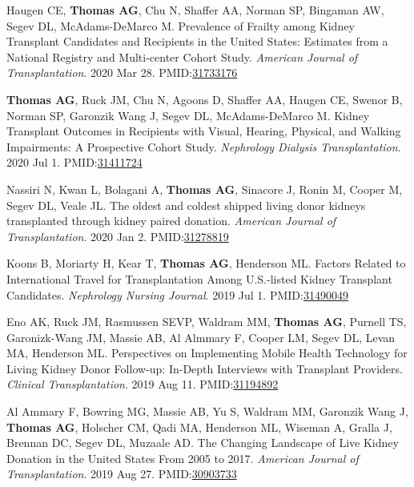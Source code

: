 \documentclass[10pt]{article}
\makeatletter
\newlength{\bibhang}
\newlength{\bibsep}
 {\@listi \global\bibsep\itemsep \global\advance\bibsep by\parsep}
\newenvironment{bibenum*}
  {\renewcommand\labelenumi{[\theenumi]}%
   \etaremune[
     topsep=0pt,
     itemsep=\bibsep,
     parsep=0pt,partopsep=0pt,
     itemindent=-\bibhang,
     leftmargin={\bibhang+\widthof{[999]}}]}
  {\endetaremune}
\newcommand{\pmid}[1]{PMID:\href{https://www.ncbi.nlm.nih.gov/pubmed/#1}{#1}}
\makeatother
\begin{document}
\begin{bibenum*}
\item Haugen CE\dag, \textbf{Thomas AG\dag}, Chu N, Shaffer AA, Norman SP,
  Bingaman AW, Segev DL, McAdams-DeMarco M.
  Prevalence of Frailty among Kidney Transplant Candidates and Recipients
  in the United States: Estimates from a National Registry and Multi-center
  Cohort Study.
  \emph{American Journal of Transplantation}. 2020 Mar 28.
  \pmid{31733176} 

\item \textbf{Thomas AG}, Ruck JM, Chu N, Agoons D, Shaffer AA, Haugen CE,
  Swenor B, Norman SP, Garonzik Wang J, Segev DL, McAdams-DeMarco M.
  Kidney Transplant Outcomes in Recipients with Visual, Hearing,
  Physical, and Walking Impairments: A Prospective Cohort Study.
  \emph{Nephrology Dialysis Transplantation}. 2020 Jul 1.
  \pmid{31411724} 

\item Nassiri N, Kwan L, Bolagani A, \textbf{Thomas AG}, Sinacore J, Ronin M,
  Cooper M, Segev DL, Veale JL.
  The oldest and coldest shipped living donor kidneys transplanted
  through kidney paired donation.
  \emph{American Journal of Transplantation}. 2020 Jan 2.
  \pmid{31278819} 

\item Koons B, Moriarty H, Kear T, \textbf{Thomas AG}, Henderson ML.
  Factors Related to International Travel for Transplantation Among U.S.-listed
  Kidney Transplant Candidates.
  \emph{Nephrology Nursing Journal}. 2019 Jul 1.
  \pmid{31490049} %

\item Eno AK, Ruck JM, Rasmussen SEVP, Waldram MM, \textbf{Thomas AG},
  Purnell TS, Garonizk-Wang JM, Massie AB, Al Almmary F, Cooper LM,
  Segev DL, Levan MA, Henderson ML.
  Perspectives on Implementing Mobile Health Technology for Living Kidney
  Donor Follow-up: In-Depth Interviews with Transplant Providers.
  \emph{Clinical Transplantation}. 2019 Aug 11.
  \pmid{31194892} 

\item Al Ammary F, Bowring MG, Massie AB, Yu S, Waldram MM, Garonzik Wang J,
  \textbf{Thomas AG}, Holscher CM, Qadi MA, Henderson ML, Wiseman A,
  Gralla J, Brennan DC, Segev DL, Muzaale AD.
  The Changing Landscape of Live Kidney Donation in the United States
  From 2005 to 2017.
  \emph{American Journal of Transplantation}. 2019 Aug 27.
  \pmid{30903733} 


\end{bibenum*}
\end{document}
